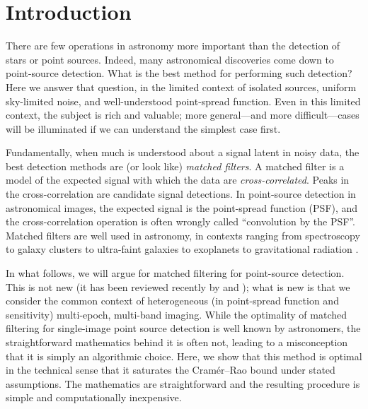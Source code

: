 \documentclass[11pt,letterpaper,linenumbers]{aastex63}
\begin{document}
\section{Introduction}

There are few operations in astronomy more important than the
detection of stars or point sources.
Indeed, many astronomical discoveries come down to point-source
detection.
What is the best method for performing such detection?
Here we answer that question, in the limited context of isolated
sources, uniform sky-limited noise, and well-understood point-spread
function.
Even in this limited context, the subject is rich and valuable; more
general---and more difficult---cases will be illuminated if we can
understand the simplest case first.

Fundamentally, when much is understood about a signal latent in noisy
data, the best detection methods are (or look like) \emph{matched
filters}.
A matched filter is a model of the expected signal with which the data
are \emph{cross-correlated}. %
Peaks in the cross-correlation are candidate signal detections.
In point-source detection in astronomical images, the expected signal is the
point-spread function (PSF), and the cross-correlation operation is often
wrongly called ``convolution by the PSF''.
Matched filters are well used in astronomy, in contexts ranging from
spectroscopy \citep{bossspectro} to
galaxy clusters \citep{redmapper, melin} to
ultra-faint galaxies \citep{willman1} to
exoplanets \citep{exoplanet} to
gravitational radiation \citep{ligo}.


In what follows, we will argue for matched filtering for point-source
detection.  This is not new (it has been reviewed recently by
\cite{zackay1} and \cite{zackay2}); what is new is that we consider the common context of
heterogeneous (in point-spread function and sensitivity) multi-epoch,
multi-band imaging.
%
While the optimality of matched filtering for single-image point
source detection is well known by astronomers, the straightforward
mathematics behind it is often not, leading to a misconception that it
is simply an algorithmic choice.  Here, we show that this method is
optimal in the technical sense that it saturates the Cram\'er--Rao
bound under stated assumptions.  The mathematics are straightforward
and the resulting procedure is simple and computationally inexpensive.
\end{document}
